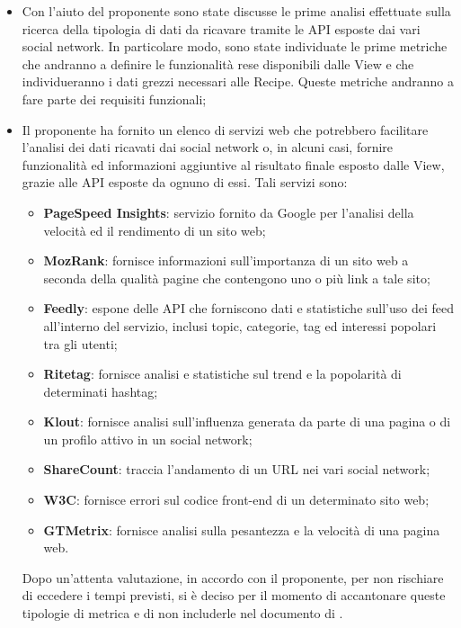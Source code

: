 \begin{itemize}
 	\item Con l'aiuto del proponente sono state discusse le prime analisi effettuate sulla ricerca della tipologia di dati da ricavare tramite le API esposte dai vari social network. In particolare modo, sono state individuate le prime metriche che andranno a definire le funzionalità rese disponibili dalle View e che individueranno i dati grezzi necessari alle Recipe. Queste metriche andranno a fare parte dei requisiti funzionali;
	\item Il proponente ha fornito un elenco di servizi web che potrebbero facilitare l'analisi dei dati ricavati dai social network o, in alcuni casi, fornire funzionalità ed informazioni aggiuntive al risultato finale esposto dalle View, grazie alle API esposte da ognuno di essi. Tali servizi sono:
  	\begin{itemize}
    	\item \textbf{PageSpeed Insights}: servizio fornito da Google per l'analisi della velocità ed il rendimento di un sito web;
    	\item \textbf{MozRank}: fornisce informazioni sull'importanza di un sito web a seconda della qualità pagine che contengono uno o più link a tale sito;
    	\item \textbf{Feedly}: espone delle API che forniscono dati e statistiche sull'uso dei feed all'interno del servizio, inclusi topic, categorie, tag ed interessi popolari tra gli utenti;
    	\item \textbf{Ritetag}: fornisce analisi e statistiche sul trend e la popolarità di determinati hashtag;
    	\item \textbf{Klout}: fornisce analisi sull'influenza generata da parte di una pagina o di un profilo attivo in un social network;
    	\item \textbf{ShareCount}: traccia l'andamento di un URL nei vari social network;
    	\item \textbf{W3C}: fornisce errori sul codice front-end di un determinato sito web;
    	\item \textbf{GTMetrix}: fornisce analisi sulla pesantezza e la velocità di una pagina web.
  	\end{itemize}
	\noindent
	Dopo un'attenta valutazione, in accordo con il proponente, per non rischiare di eccedere i tempi previsti, si è deciso per il momento di accantonare queste tipologie di metrica e di non includerle nel documento di \docNameVersionAdR.
\end{itemize}

